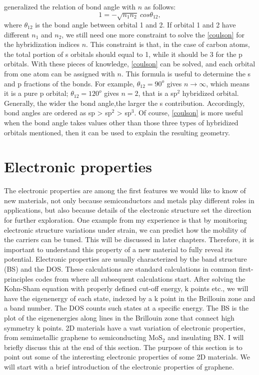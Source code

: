 \citet{coulson1949} generalized the relation of bond angle with $n$ as follows:
\begin{equation}\label{coulson}
1=-\sqrt{n_1n_2}~cos\theta_{12}, 
\end{equation}
where $\theta_{12}$ is the bond angle between orbital 1 and 2. If orbital 1 and 2 have different $n_1$ and $n_2$, we still need one more constraint to solve the \autoref{coulson} for the hybridization indices $n$. This constraint is that, in the case of carbon atoms, the total portion of s orbitals should equal to 1, while it should be 3 for the p orbitals. With these pieces of knowledge, \autoref{coulson} can be solved, and each orbital from one atom can be assigned with $n$. This formula is useful to determine the s and p fractions of the bonds. For example, $\theta_{12}=90^o$ gives $n\rightarrow\infty$, which means it is a pure p orbital; $\theta_{12}=120^o$ gives $n=2$, that is a sp$^2$ hybridized orbital. Generally, the wider the bond angle,the larger the s contribution. Accordingly, bond angles are ordered as sp > sp$^2$ > sp$^3$. Of course, \autoref{coulson} is more useful when the bond angle takes values other than those three types of hybridized orbitals mentioned, then it can be used to explain the resulting geometry.

\section{Electronic properties}

The electronic properties are among the first features we would like to know of new materials, not only because semiconductors and metals play different roles in applications, but also because details of the electronic structure set the direction for further exploration. One example from my experience is that by monitoring electronic structure variations under strain, we can predict how the mobility of the carriers can be tuned. This will be discussed in later chapters. Therefore, it is important to understand this property of a new material to fully reveal its potential. Electronic properties are usually characterized by the band structure (BS) and the DOS. These calculations are standard calculations in common first-principles codes from where all subsequent calculations start. After solving the Kohn-Sham equation with properly defined cut-off energy, k points etc., we will have the eigenenergy of each state, indexed by a k point in the Brillouin zone and a band number.  The DOS counts such states at a specific energy. The BS is the plot of the eigenenergies along lines in the Brillouin zone that connect high symmetry k points.  2D materials have a vast variation of electronic properties, from semimetallic graphene to semiconducting MoS$_2$ and insulating BN. I will briefly discuss this at the end of this section. The purpose of this section is to point out some of the interesting electronic properties of some 2D materials. We will start with a brief introduction of the electronic properties of graphene.

